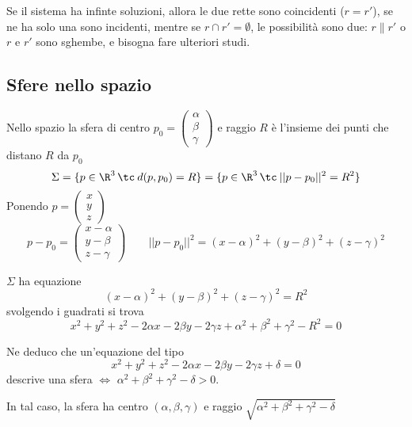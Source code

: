 Se il sistema ha infinte soluzioni, allora le due rette sono coincidenti ($r=r'$), se ne ha solo una sono incidenti, mentre se $ r\cap r'=\emptyset $, le possibilità sono due: $ r\parallel r' $ o $ r $ e $ r'$ sono sghembe, e bisogna fare ulteriori studi.

\subsection{Sfere nello spazio}

Nello spazio la sfera di centro $ p_0=\left(\begin{smallmatrix}
    \alpha\\ \beta\\ \gamma
\end{smallmatrix}\right) $ e raggio $ R $ è l'insieme dei punti che distano $ R $ da $ p_0 $ \[
    \Sigma = \{p \in \R^{3}\,\tc\: d(p,p_0)=R\}=\{p \in \R^{3}\,\tc\: ||p-p_0||^{2}=R^{2}\}
\]
Ponendo $ p=\left(\begin{smallmatrix}
    x\\ y\\ z
\end{smallmatrix}\right) $\[
    p-p_0=\begin{pmatrix}
        x-\alpha\\
        y-\beta\\
        z-\gamma
    \end{pmatrix}\qquad ||p-p_0||^{2}=(x-\alpha)^{2}+(y-\beta)^{2}+(z-\gamma)^{2}
\]

$ \Sigma $ ha equazione \begin{equation}
    (x-\alpha)^{2}+(y-\beta)^{2}+(z-\gamma)^{2}=R^{2}
\end{equation} svolgendo i guadrati si trova \begin{equation}
    x^{2}+y^{2}+z^{2}-2\alpha x -2 \beta y -2\gamma z + \alpha^{2}+\beta^{2}+\gamma^{2}-R^{2}=0
\end{equation}

Ne deduco che un'equazione del tipo \[
    x^{2}+y^{2}+z^{2}-2\alpha x-2 \beta y -2\gamma z + \delta=0
\] descrive una sfera $\iff $ $ \alpha^{2}+\beta^{2}+\gamma^{2}-\delta>0 $.

In tal caso, la sfera ha centro $ (\alpha, \beta, \gamma) $ e raggio $ \sqrt{\alpha^{2}+\beta^{2}+\gamma^{2}-\delta} $


